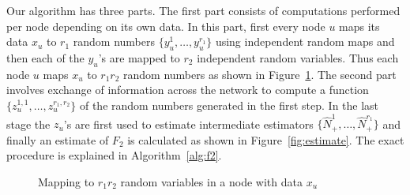 \documentclass[10pt,twosided,a4paper,draft,onecolumn]{article}
\begin{document}
Our algorithm has three parts. The first part consists of computations
performed per node depending on its own data. In this part, first
every node $u$ maps its data $x_u$ to $r_1$ random numbers $\{y_u^{1}
, \ldots ,y_u^{r_1} \}$ using independent random maps and then each of
the $y_u$'s are mapped to $r_2$ independent random variables. Thus
each node $u$ maps $x_u$ to $r_1r_2$ random numbers as shown in
Figure~\ref{fig:map}. The second part involves exchange of information
across the network to compute a function $\{z_u^{1,1} , \ldots ,
z_u^{r_1,r_2}\}$ of the random numbers generated in the first step. In
the last stage the $z_u$'s are first used to estimate intermediate
estimators $\{\hat{N}_+^1, \ldots, \hat{N}_+^{r_1}\}$ and finally an
estimate of $F_2$ is calculated as shown in Figure~\ref{fig:estimate}.
The exact procedure is explained in Algorithm~\ref{alg:f2}.

\begin{figure}[h]
\begin{center}
\end{center}
\caption{Mapping to $r_1r_2$ random variables in a node with data $x_u$}
\label{fig:map}
\end{figure}
\end{document}
